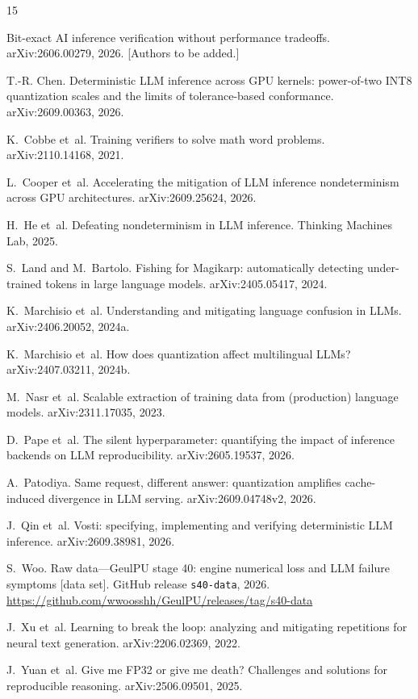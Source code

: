 \documentclass[11pt]{article}
\begin{document}
\begin{thebibliography}{15}

Bit-exact AI inference verification without performance tradeoffs. arXiv:2606.00279, 2026. [Authors to be added.]

T.-R. Chen. Deterministic LLM inference across GPU kernels: power-of-two INT8 quantization scales and the limits of
tolerance-based conformance. arXiv:2609.00363, 2026.

K.~Cobbe et~al. Training verifiers to solve math word problems. arXiv:2110.14168, 2021.

L.~Cooper et~al. Accelerating the mitigation of LLM inference nondeterminism across GPU architectures. arXiv:2609.25624,
2026.

H.~He et~al. Defeating nondeterminism in LLM inference. Thinking Machines Lab, 2025.

S.~Land and M.~Bartolo. Fishing for Magikarp: automatically detecting under-trained tokens in large language models.
arXiv:2405.05417, 2024.

K.~Marchisio et~al. Understanding and mitigating language confusion in LLMs. arXiv:2406.20052, 2024a.

K.~Marchisio et~al. How does quantization affect multilingual LLMs? arXiv:2407.03211, 2024b.

M.~Nasr et~al. Scalable extraction of training data from (production) language models. arXiv:2311.17035, 2023.

D.~Pape et~al. The silent hyperparameter: quantifying the impact of inference backends on LLM reproducibility.
arXiv:2605.19537, 2026.

A.~Patodiya. Same request, different answer: quantization amplifies cache-induced divergence in LLM serving.
arXiv:2609.04748v2, 2026.

J.~Qin et~al. Vosti: specifying, implementing and verifying deterministic LLM inference. arXiv:2609.38981, 2026.

S.~Woo. Raw data---GeulPU stage 40: engine numerical loss and LLM failure symptoms [data set]. GitHub release
\texttt{s40-data}, 2026. \url{https://github.com/wwoosshh/GeulPU/releases/tag/s40-data}

J.~Xu et~al. Learning to break the loop: analyzing and mitigating repetitions for neural text generation.
arXiv:2206.02369, 2022.

J.~Yuan et~al. Give me FP32 or give me death? Challenges and solutions for reproducible reasoning. arXiv:2506.09501, 2025.

\end{thebibliography}
\end{document}
